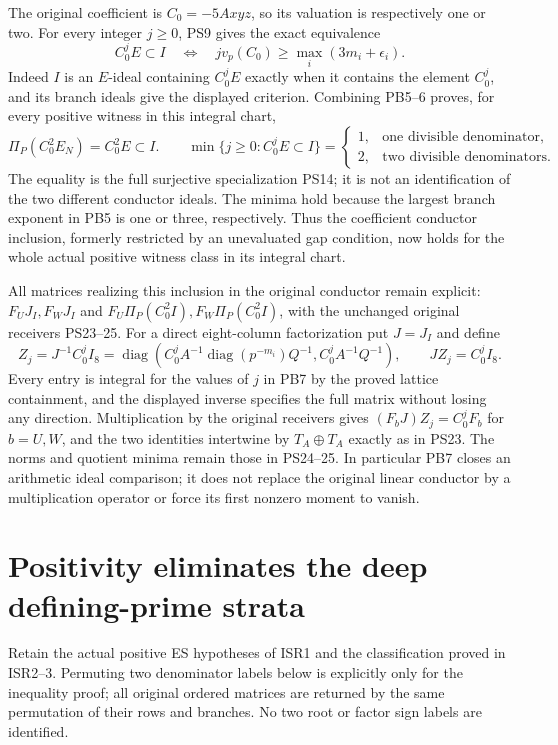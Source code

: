 \documentclass[11pt]{article}
\newcommand{\diag}{\operatorname{diag}}
\begin{document}
The original coefficient is $C_0=-5Axyz$, so its valuation is respectively
one or two. For every integer $j\ge0$, PS9 gives the exact equivalence
\[
 C_0^jE\subset I\quad\Longleftrightarrow\quad
 jv_p(C_0)\ge\max_i(3m_i+\epsilon_i).
 \tag{PB6}
\]
Indeed $I$ is an $E$-ideal containing $C_0^jE$ exactly when it contains
the element $C_0^j$, and its branch ideals give the displayed criterion.
Combining PB5--6 proves, for every positive witness in this integral chart,
\[
 \boxed{\Pi_P(C_0^2E_N)=C_0^2E\subset I.}\qquad
 \min\{j\ge0:C_0^jE\subset I\}=
 \begin{cases}1,&\text{one divisible denominator},\\
 2,&\text{two divisible denominators}.
 \end{cases}\tag{PB7}
\]
The equality is the full surjective specialization PS14; it is not an
identification of the two different conductor ideals. The minima hold
because the largest branch exponent in PB5 is one or three, respectively.
Thus the coefficient conductor inclusion, formerly restricted by an
unevaluated gap condition, now holds for the whole actual positive
witness class in its integral chart.

All matrices realizing this inclusion in the original conductor remain
explicit: $F_UJ_I,F_WJ_I$ and $F_U\Pi_P(C_0^2I),F_W\Pi_P(C_0^2I)$,
with the unchanged original receivers PS23--25. For a direct eight-column
factorization put $J=J_I$ and define
\[
 Z_j=J^{-1}C_0^jI_8
 =\diag\!\left(C_0^j A^{-1}\diag(p^{-m_i})Q^{-1},
                   C_0^j A^{-1}Q^{-1}\right),\qquad
 JZ_j=C_0^jI_8.
 \tag{PB8}
\]
Every entry is integral for the values of $j$ in PB7 by the proved
lattice containment, and the displayed inverse specifies the full
matrix without losing any direction. Multiplication by the original
receivers gives $(F_bJ)Z_j=C_0^jF_b$ for $b=U,W$, and the two
identities intertwine by $T_A\oplus T_A$ exactly as in PS23.
The norms and quotient minima remain those in PS24--25. In particular
PB7 closes an arithmetic ideal comparison; it does not replace the
original linear conductor by a multiplication operator or force its
first nonzero moment to vanish.

\section{Positivity eliminates the deep defining-prime strata}
Retain the actual positive ES hypotheses of ISR1 and the classification
proved in ISR2--3. Permuting two denominator labels below is explicitly
only for the inequality proof; all original ordered matrices are returned
by the same permutation of their rows and branches. No two root or factor
sign labels are identified.
\end{document}
